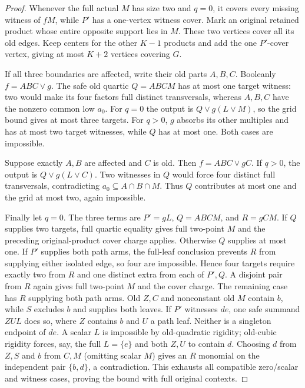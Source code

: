 \documentclass[11pt]{article}
\theoremstyle{definition}
\theoremstyle{remark}
\begin{document}
\begin{proof}
Whenever the full actual $M$ has size two and $q=0$, it covers every missing witness of $fM$, while $P'$ has a one-vertex witness cover. Mark an original retained product whose entire opposite support lies in $M$. These two vertices cover all its old edges. Keep centers for the other $K-1$ products and add the one $P'$-cover vertex, giving at most $K+2$ vertices covering $G$.

If all three boundaries are affected, write their old parts $A,B,C$. Booleanly $f=ABC\vee g$. The safe old quartic $Q=ABCM$ has at most one target witness: two would make its four factors full distinct transversals, whereas $A,B,C$ have the nonzero common low $a_0$. For $q=0$ the output is $Q\vee g(L\vee M)$, so the grid bound gives at most three targets. For $q>0$, $g$ absorbs its other multiples and has at most two target witnesses, while $Q$ has at most one. Both cases are impossible.

Suppose exactly $A,B$ are affected and $C$ is old. Then $f=ABC\vee gC$. If $q>0$, the output is $Q\vee g(L\vee C)$. Two witnesses in $Q$ would force four distinct full transversals, contradicting $a_0\subseteq A\cap B\cap M$. Thus $Q$ contributes at most one and the grid at most two, again impossible.

Finally let $q=0$. The three terms are $P'=gL$, $Q=ABCM$, and $R=gCM$. If $Q$ supplies two targets, full quartic equality gives full two-point $M$ and the preceding original-product cover charge applies. Otherwise $Q$ supplies at most one. If $P'$ supplies both path arms, the full-leaf conclusion prevents $R$ from supplying either isolated edge, so four are impossible. Hence four targets require exactly two from $R$ and one distinct extra from each of $P',Q$. A disjoint pair from $R$ again gives full two-point $M$ and the cover charge. The remaining case has $R$ supplying both path arms. Old $Z,C$ and nonconstant old $M$ contain $b$, while $S$ excludes $b$ and supplies both leaves. If $P'$ witnesses $de$, one safe summand $ZUL$ does so, where $Z$ contains $b$ and $U$ a path leaf. Neither is a singleton endpoint of $de$. A scalar $L$ is impossible by old-quadratic rigidity; old-cubic rigidity forces, say, the full $L=\{e\}$ and both $Z,U$ to contain $d$. Choosing $d$ from $Z,S$ and $b$ from $C,M$ (omitting scalar $M$) gives an $R$ monomial on the independent pair $\{b,d\}$, a contradiction. This exhausts all compatible zero/scalar and witness cases, proving the bound with full original contexts.
\end{proof}
\end{document}
